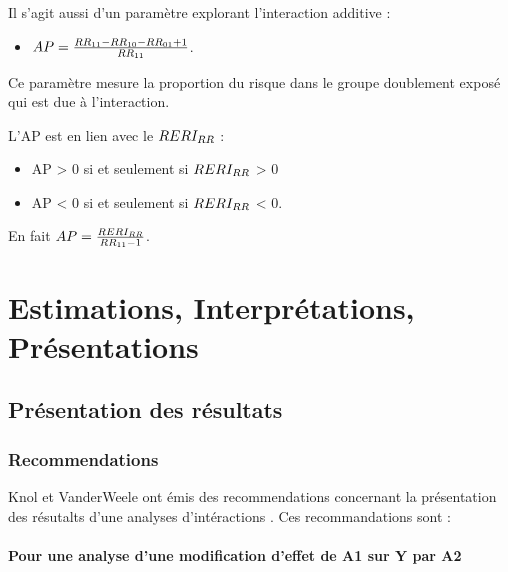 \documentclass[
]{book}
\providecommand{\tightlist}{%
  \setlength{\itemsep}{0pt}\setlength{\parskip}{0pt}}
\begin{document}
Il s'agit aussi d'un paramètre explorant l'interaction additive :

\begin{itemize}
\tightlist
\item
  \(\small AP = \frac{RR_{11} - RR_{10} - RR_{01} + 1}{RR_{11}}\).
\end{itemize}

Ce paramètre mesure la proportion du risque dans le groupe doublement exposé qui est due à l'interaction.

L'AP est en lien avec le \(\small RERI_{RR}\) :

\begin{itemize}
\tightlist
\item
  AP \textgreater{} 0 si et seulement si \(\small RERI_{RR}\) \textgreater{} 0
\item
  AP \textless{} 0 si et seulement si \(\small RERI_{RR}\) \textless{} 0.
\end{itemize}

En fait \(\small AP = \frac{RERI_{RR}}{RR_{11}-1}\).

\hypertarget{part-estimations-interpruxe9tations-pruxe9sentations}{%
\part{Estimations, Interprétations, Présentations}\label{part-estimations-interpruxe9tations-pruxe9sentations}}

\hypertarget{pruxe9sentation-des-ruxe9sultats}{%
\chapter{Présentation des résultats}\label{pruxe9sentation-des-ruxe9sultats}}

\hypertarget{recommendations}{%
\section{Recommendations}\label{recommendations}}

Knol et VanderWeele ont émis des recommendations concernant la présentation des résutalts d'une analyses d'intéractions \citet{knol_recommendations_2012}. Ces recommandations sont :

\hypertarget{pour-une-analyse-dune-modification-deffet-de-a1-sur-y-par-a2}{%
\subsection*{Pour une analyse d'une modification d'effet de A1 sur Y par A2}\label{pour-une-analyse-dune-modification-deffet-de-a1-sur-y-par-a2}}
\end{document}
